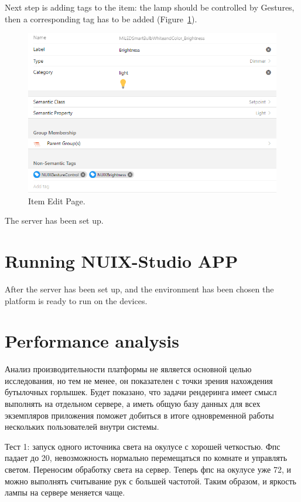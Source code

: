 Next step is adding tags to the item: the lamp should be controlled by Gestures, then a corresponding tag has to be added (Figure~\ref{fig:ItemEditPage-figure}).

\begin{figure}
  \centering
  \includegraphics[width=0.9\linewidth]{figures/ItemEditPage.png}
  \caption{Item Edit Page.}
  \label{fig:ItemEditPage-figure}
\end{figure}

The server has been set up.

\section{Running NUIX-Studio APP}

After the server has been set up, and the environment has been chosen the platform is ready to run on the devices.

\section{Performance analysis}

Анализ производительности платформы не является основной целью исследования, но тем не менее, он показателен с точки зрения нахождения бутылочных горлышек. Будет показано, что задачи рендеринга имеет смысл выполнять на отдельном сервере, а иметь общую базу данных для всех экземпляров приложения поможет добиться в итоге одновременной работы нескольких пользователей внутри системы.


Тест 1: запуск одного источника света на окулусе с хорошей четкостью. Фпс падает до 20, невозможность нормально перемещаться по комнате и управлять светом. Переносим обработку света на сервер. Теперь фпс на окулусе уже 72, и можно выполнять считывание рук с большей частотой. Таким образом, и яркость лампы на сервере меняется чаще. 

